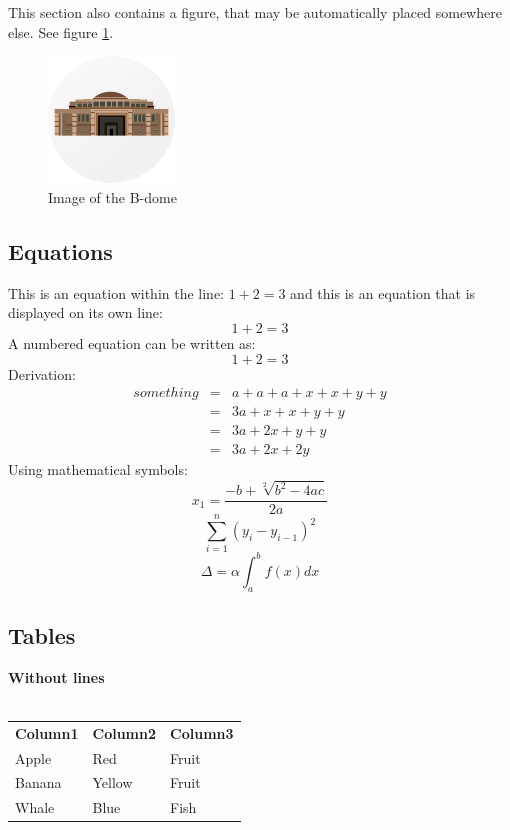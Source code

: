 \documentclass[a4paper, 12pt]{article}
\begin{document}
This section also contains a figure, that may be automatically placed somewhere else. See figure \ref{bdome}. 
\begin{figure}[h]
\centering
\includegraphics[width=0.3\textwidth]{bdome.png}
\caption{Image of the B-dome}
\label{bdome}
\end{figure}



\subsection{Equations}
This is an equation within the line: $1 + 2 = 3$ and this is an equation that is displayed on its own line: $$1 + 2 = 3$$
A numbered equation can be written as:
\begin{equation}1 + 2 = 3 \end{equation}
Derivation:
\begin{eqnarray*}
something & = & a + a + a + x + x +y +y\\
& = &3a + x + x + y + y\\
& = &3a + 2x + y + y\\
& = &3a + 2x + 2y
\end{eqnarray*}
Using mathematical symbols:
$$x_1 = \frac{-b + \sqrt[2]{b^2 - 4ac}}{2a}$$
$$\sum_{i=1}^n (y_i - y_{i-1})^2$$
$$\Delta = \alpha\int_a^b f(x)dx$$




\subsection{Tables}
\label{tables}
\textbf{Without lines}\\
\\
\begin{tabular}{|l|l|l|}
\textbf{Column1} & \textbf{Column2} & \textbf{Column3} \\
Apple & Red & Fruit \\
Banana & Yellow & Fruit\\
Whale & Blue & Fish\\
\end{tabular}
\\
\\
\end{document}
